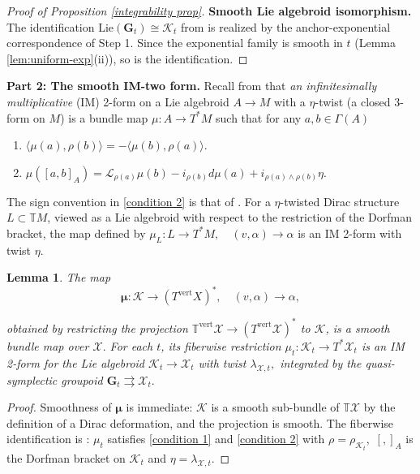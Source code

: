 \documentclass[reqno]{amsart}
\theoremstyle{plain}
\newtheorem{Lem}[Thm]{Lemma}
\theoremstyle{definition}
\newcommand{\too}{\longrightarrow}
\renewcommand{\L}{\mathcal{L}}
\newcommand{\X}{\mathcal{X}}
\newcommand{\K}{\mathcal{K}}
\begin{document}
\begin{proof}[Proof of Proposition \ref{integrability prop}]
\medskip
\noindent\textbf{Smooth Lie algebroid isomorphism.}
The identification $\mathrm{Lie}(\mathbf{G}_t) \cong \K_t$ from
\cite[Theorem 4.1]{crainic2003integrability} is realized by the anchor-exponential correspondence of Step 1. Since the exponential family is smooth in $t$
(Lemma \ref{lem:uniform-exp}(ii)), so is the identification.
\end{proof}



\noindent\textbf{Part 2: The smooth IM-two form.} Recall from \cite{bursztyn2012multiplicative,bursztyn2004integration} that \textit{an infinitesimally multiplicative} (IM) 2-form on a Lie algebroid $A\too M$ with a $\eta$-twist (a closed 3-form on $M$) is a bundle map $\mu: A\too T^{*}M$ such that for any $a,b \in \Gamma(A)$ \begin{enumerate}
    \item $\langle \mu(a),\rho(b) \rangle = -\langle \mu(b),\rho(a) \rangle.$ \label{condition 1}
    \item $\mu([a,b]_A) = \L_{\rho(a)}\mu(b) - i_{\rho(b)}d\mu(a) + i_{\rho(a)\wedge \rho(b)}\eta.$ \label{condition 2}
\end{enumerate}


The sign convention in \ref{condition 2} is that of \cite[]{bursztyn2004integration}. For a $\eta$-twisted Dirac structure $L \subset \mathbb{T}M$, viewed as a Lie algebroid with respect to the restriction of the Dorfman bracket, the map defined by $\mu_L: L \too T^{*}M, \quad (v,\alpha) \too \alpha$ is an IM 2-form with twist $\eta$.

\begin{Lem} \label{IM 2 form}
    The map \[
    \mathbf{\mu}: \K \too (T^{\text{vert}}X)^{*}, \quad (v,\alpha) \too \alpha,
    \]
    
obtained by restricting the projection $\mathbb{T}^{\text{vert}}\X \too (T^{\text{vert}}\X)^{*}$ to $\K$, is a smooth bundle map over $\X.$ For each $t$, its fiberwise restriction $\mu_t: \K_t \too T^{*}\X_t$ is an IM 2-form for the Lie algebroid $\K_t \too \X_t$ with twist $\lambda_{\X,t},$ integrated by the quasi-symplectic groupoid $\mathbf{G}_t \rightrightarrows \X_t.$
\end{Lem}

\begin{proof}
Smoothness of $\mathbf{\mu}$ is immediate: $\K$ is a smooth sub-bundle of $\mathbb{T}\X$ by the definition of a Dirac deformation, and the projection is smooth. The fiberwise identification is \cite{bursztyn2004integration}: $\mu_t$ satisfies \ref{condition 1} and \ref{condition 2} with $\rho = \rho_{\K_t},$ $[,]_{A}$ is the Dorfman bracket on $\K_t$ and $\eta = \lambda_{\X,t}.$
\end{proof}
\end{document}
